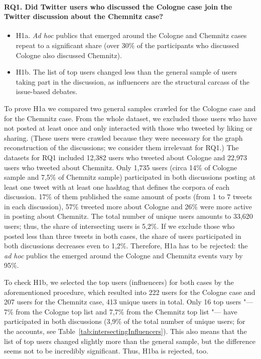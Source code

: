 \paragraph{RQ1. Did Twitter users who discussed the Cologne case join the Twitter discussion about the Chemnitz case?}

\begin{itemize}
	\item H1a. \textit{Ad hoc} publics that emerged around the Cologne and Chemnitz cases repeat to a significant share (over 30\% of the participants who discussed Cologne also discussed Chemnitz).
	\item H1b. The list of top users changed less than the general sample of users taking part in the discussion, as influencers are the structural carcass of the issue-based debates.
\end{itemize}

To prove H1a we compared two general samples crawled for the Cologne case and for the Chemnitz case. From the whole dataset, we excluded those users who have not posted at least once and only interacted with those who tweeted by liking or sharing. (These users were crawled because they were necessary for the graph reconstruction of the discussions; we consider them irrelevant for RQ1.) The datasets for RQ1 included 12,382 users who tweeted about Cologne and 22,973 users who tweeted about Chemnitz. Only 1,735 users (circa 14\% of Cologne sample and 7,5\% of Chemnitz sample) participated in both discussions posting at least one tweet with at least one hashtag that defines the corpora of each discussion. 17\% of them published the same amount of posts (from 1 to 7 tweets in each discussion), 57\% tweeted more about Cologne and 26\% were more active in posting about Chemnitz. The total number of unique users amounts to 33,620 users; thus, the share of intersecting users is 5,2\%. If we exclude those who posted less than three tweets in both cases, the share of users participated in both discussions decreases even to 1,2\%. Therefore, H1a has to be rejected: the \textit{ad hoc} publics the emerged around the Cologne and Chemnitz events vary by 95\%.

To check H1b, we selected the top users (influencers) for both cases by the aforementioned procedure, which resulted into 222 users for the Cologne case and 207 users for the Chemnitz case, 413 unique users in total. Only 16 top users "--- 7\% from the Cologne top list and 7,7\% from the Chemnitz top list "--- have participated in both discussions (3,9\% of the total number of unique users; for the accounts, see Table~\cref{tab:intersectingInfluencers}). This also means that the list of top users changed slightly more than the general sample, but the difference seems not to be incredibly significant. Thus, H1ba is rejected, too.

